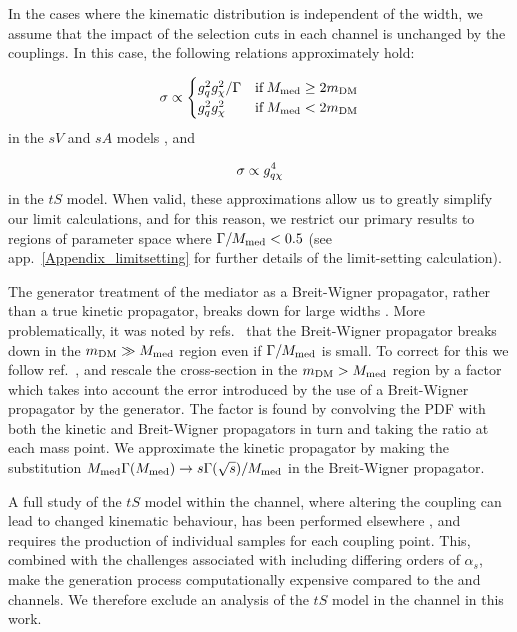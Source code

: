 In the cases where the kinematic distribution is independent of the width, we assume that the impact of the selection cuts in each channel is unchanged by the couplings. In this case, the following relations approximately hold:

\begin{equation}
  \sigma \propto
  \begin{cases}
      g_q^2 g_{\chi}^2 / \Gamma & \mathrm{ if } \, M_{\mathrm{med}} \geq 2 m_{\mathrm{DM}}\\
      g_q^2 g_{\chi}^2 & \mathrm{ if } \, M_{\mathrm{med}} < 2 m_{\mathrm{DM}}
  \end{cases}
  \label{eq:sigma_propto_couplings_schan}
\end{equation}
in the $sV$ and $sA$ models  \cite{NordstromSVD}, and

\begin{equation}
  \sigma \propto g_{q \chi}^4
  \label{eq:sigma_propto_couplings_tchan}
\end{equation}
in the $tS$ model. When valid, these approximations allow us to greatly simplify our limit calculations, and for this reason, we restrict our primary results to regions of parameter space where $\Gamma/M_{\mathrm{med}} < 0.5$ (see app.~\ref{Appendix_limitsetting} for further details of the limit-setting calculation).

The generator treatment of the mediator as a Breit-Wigner propagator, rather than a true kinetic propagator, breaks down for large widths \cite{An:2012va,NordstromSVD}. More problematically, it was noted by refs.~\cite{NordstromSVD,An:2012va} that the Breit-Wigner propagator breaks down in the $m_{\mathrm{DM}} \gg M_{\mathrm{med}}$ region even if $\Gamma/M_{\mathrm{med}}$ is small. To correct for this we follow ref.~\cite{NordstromSVD}, and rescale the cross-section in the $m_{\mathrm{DM}} > M_{\mathrm{med}}$ region by a factor which takes into account the error introduced by the use of a Breit-Wigner propagator by the generator. The factor is found by convolving the PDF with both the kinetic and Breit-Wigner propagators in turn and taking the ratio at each mass point. We approximate the kinetic propagator by making the substitution $M_{\mathrm{med}} \Gamma(M_{\mathrm{med}}) \rightarrow s \Gamma(\sqrt{s}) / M_{\mathrm{med}}$ in the Breit-Wigner propagator.

A full study of the $tS$ model within the \monojet channel, where altering the coupling can lead to changed kinematic behaviour, has been performed elsewhere \cite{Zurek:tchannel}, and requires the production of individual samples for each coupling point. This, combined with the challenges associated with including differing orders of $\alpha_s$, make the generation process computationally expensive compared to the \monoZ and \monoWZ channels. We therefore exclude an analysis of the $tS$ model in the \monojet channel in this work.

